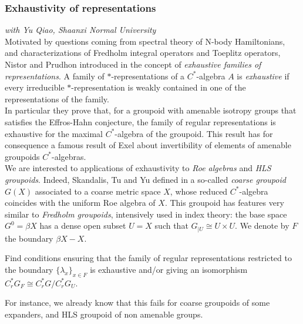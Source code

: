 \subsubsection*{Exhaustivity of representations}

\textit{with Yu Qiao, Shaanxi Normal University}\\

Motivated by questions coming from spectral theory of N-body Hamiltonians, and characterizations of Fredholm integral operators and Toeplitz operators, Nistor and Prudhon introduced in \cite{NistorPrudhon} the concept of \textit{exhaustive families of representations}. A family of $*$-representations of a $C^*$-algebra $A$ is \textit{exhaustive} if every irreducible $*$-representation is weakly contained in one of the representations of the family.\\

In particular they prove that, for a groupoid with amenable isotropy groups that satisfies the Effros-Hahn conjecture, the family of regular representations is exhaustive for the maximal $C^*$-algebra of the groupoid. This result has for consequence a famous result of Exel \cite{exel2014invertibility} about invertibility of elements of amenable groupoids $C^*$-algebras.\\

We are interested to applications of exhaustivity to \textit{Roe algebras} and \textit{HLS groupoids}. Indeed, Skandalis, Tu and Yu defined in \cite{SkTuYu} a so-called \textit{coarse groupoid} $G(X)$ associated to a coarse metric space $X$, whose reduced $C^*$-algebra coincides with the uniform Roe algebra of $X$. This groupoid has features very similar to \textit{Fredholm groupoids}, intensively used in index theory: the base space $G^0 = \beta X$ has a dense open subset $U=X$ such that $G_{|U}\cong U\times U$. We denote by $F$ the boundary $\beta X - X$.

\begin{project}
Find conditions ensuring that the family of regular representations restricted to the boundary $\{\lambda_x\}_{x\in F}$ is exhaustive and/or giving an isomorphism $C_r^*G_F \cong C^*_r G / C^*_r G_U$.
\end{project}
 
For instance, we already know that this fails for coarse groupoids of some expanders, and HLS groupoid of non amenable groups. 


